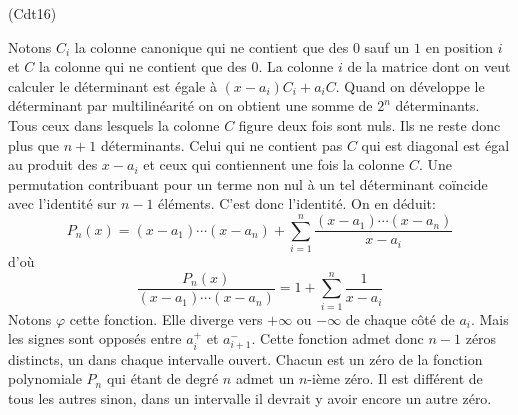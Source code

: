 \begin{tiny}(Cdt16)\end{tiny} Notons $C_i$ la colonne canonique qui ne contient que des $0$ sauf un $1$ en position $i$ et $C$ la colonne qui ne contient que des $0$.\newline
La colonne $i$ de la matrice dont on veut calculer le déterminant est égale à $(x-a_i)C_i +a_iC$. Quand on développe le déterminant par multilinéarité on on obtient une somme de $2^n$ déterminants. Tous ceux dans lesquels la colonne $C$ figure deux fois sont nuls. Ils ne reste donc plus que $n+1$ déterminants. Celui qui ne contient pas $C$ qui est diagonal est égal au produit des $x-a_i$ et ceux qui contiennent une fois la colonne $C$. Une permutation contribuant pour un terme non nul à un tel déterminant coïncide avec l'identité sur $n-1$ éléments. C'est donc l'identité. On en déduit: 
\begin{displaymath}
 P_n(x)=(x-a_1)\cdots(x-a_n)+\sum_{i=1}^n\frac{(x-a_1)\cdots(x-a_n)}{x-a_i}
\end{displaymath}
 d'où
\begin{displaymath}
 \frac{P_n(x)}{(x-a_1)\cdots(x-a_n)} = 1 + \sum_{i=1}^n\frac{1}{x-a_i}
\end{displaymath}
Notons $\varphi$ cette fonction. Elle diverge vers $+\infty$ ou $-\infty$ de chaque côté de $a_i$. Mais les signes sont opposés entre $a_i^+$ et $a_{i+1}^-$. Cette fonction admet donc $n-1$ zéros distincts, un dans chaque intervalle ouvert. Chacun est un zéro de la fonction polynomiale $P_n$ qui étant de degré $n$ admet un $n$-ième zéro. Il est différent de tous les autres sinon, dans un intervalle il devrait y avoir encore un autre zéro.